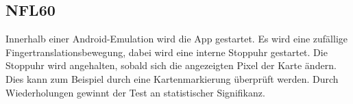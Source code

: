 \subsection*{NFL60}

Innerhalb einer Android-Emulation wird die App gestartet.
Es wird eine zufällige Fingertranslationsbewegung, dabei wird eine interne Stoppuhr gestartet.
Die Stoppuhr wird angehalten, sobald sich die angezeigten Pixel der Karte ändern.
Dies kann zum Beispiel durch eine Kartenmarkierung überprüft werden.
Durch Wiederholungen gewinnt der Test an statistischer Signifikanz.